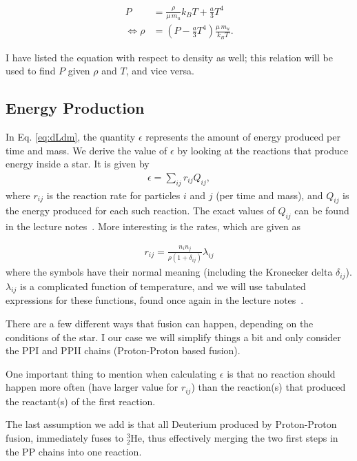 \documentclass[11pt]{article}
\begin{document}
\begin{align}
  P &= \frac{ \rho }{ \mu\,m_u }k_B T + \frac{ a }{ 3 }T^4\label{eq:P-eq_state}\\
  \Leftrightarrow \rho &= (P - \frac{a}{3}T^4) \frac{ \mu\,m_u }{ k_BT }\label{eq:rho-eq_state}.
\end{align}

I have listed the equation with respect to density as well; this
relation will be used to find $P$ given $\rho$ and $T$, and vice
versa.


\subsection{Energy Production}
In Eq. \eqref{eq:dLdm}, the quantity $\epsilon$ represents the amount
of energy produced per time and mass. We derive the value of
$\epsilon$ by looking at the reactions that produce energy inside a
star. It is given by
\begin{align}
  \epsilon = \sum_{ij}r_{ij}Q_{ij},
\end{align}
where $r_{ij}$ is the reaction rate for particles $i$ and $j$ (per
time and mass), and $Q_{ij}$ is the energy produced for each such
reaction. The exact values of $Q_{ij}$ can be found in the lecture
notes~\cite{lecture-notes}. More interesting is the rates, which are
given as

\begin{align}
  r_{ij} = \frac{n_in_j}{\rho(1+\delta_{ij})}\lambda_{ij}
\end{align}
where the symbols have their normal meaning (including the Kronecker
delta $\delta_{ij}$). $\lambda_{ij}$ is a complicated function of
temperature, and we will use tabulated expressions for these
functions, found once again in the lecture notes~\cite[Table
3.1]{lecture-notes}. 


There are a few different ways that fusion can happen, depending
on the conditions of the star. I our case we will simplify things a
bit and only consider the PPI and PPII chains (Proton-Proton based
fusion). 

One important thing to mention when calculating $\epsilon$ is that no
reaction should happen more often (have larger value for $r_{ij}$)
than the reaction(s) that produced the reactant(s) of the first
reaction. 

The last assumption we add is that all Deuterium produced by
Proton-Proton fusion, immediately fuses to $^3_2\text{He}$, thus
effectively merging the two first steps in the PP chains into one
reaction.
\end{document}
